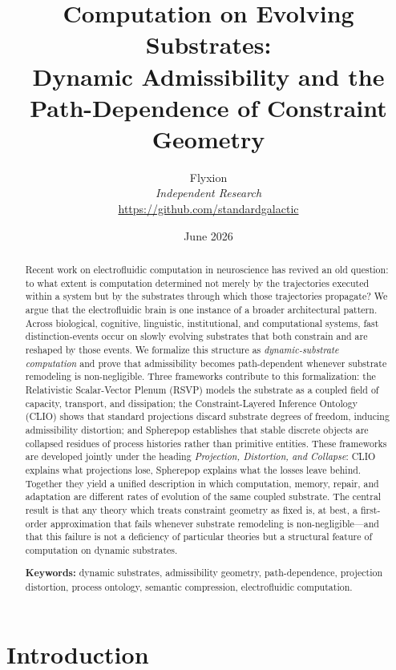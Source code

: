 \documentclass[12pt,a4paper]{article}
\title{\bfseries Computation on Evolving Substrates:\\
Dynamic Admissibility and the Path-Dependence of Constraint Geometry}
\author{Flyxion\\
\textit{Independent Research}\\
\small\url{https://github.com/standardgalactic}}
\date{June 2026}
\begin{document}
\maketitle

\begin{abstract}
Recent work on electrofluidic computation in neuroscience has revived an old question: to what extent is computation determined not merely by the trajectories executed within a system but by the substrates through which those trajectories propagate? We argue that the electrofluidic brain is one instance of a broader architectural pattern. Across biological, cognitive, linguistic, institutional, and computational systems, fast distinction-events occur on slowly evolving substrates that both constrain and are reshaped by those events. We formalize this structure as \emph{dynamic-substrate computation} and prove that admissibility becomes path-dependent whenever substrate remodeling is non-negligible. Three frameworks contribute to this formalization: the Relativistic Scalar-Vector Plenum (RSVP) models the substrate as a coupled field of capacity, transport, and dissipation; the Constraint-Layered Inference Ontology (CLIO) shows that standard projections discard substrate degrees of freedom, inducing admissibility distortion; and Spherepop establishes that stable discrete objects are collapsed residues of process histories rather than primitive entities. These frameworks are developed jointly under the heading \emph{Projection, Distortion, and Collapse}: CLIO explains what projections lose, Spherepop explains what the losses leave behind. Together they yield a unified description in which computation, memory, repair, and adaptation are different rates of evolution of the same coupled substrate. The central result is that any theory which treats constraint geometry as fixed is, at best, a first-order approximation that fails whenever substrate remodeling is non-negligible---and that this failure is not a deficiency of particular theories but a structural feature of computation on dynamic substrates.

\medskip\noindent\textbf{Keywords:} dynamic substrates, admissibility geometry, path-dependence, projection distortion, process ontology, semantic compression, electrofluidic computation.
\end{abstract}

\newpage
\tableofcontents
\newpage

\section{Introduction}
\end{document}
